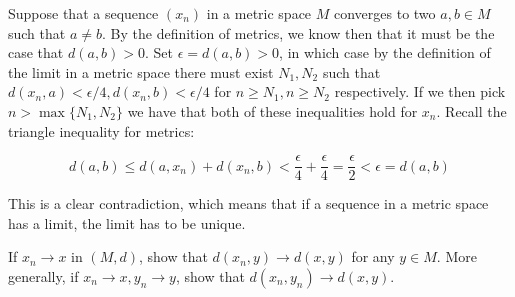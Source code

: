 \begin{solution}
    
    Suppose that a sequence $(x_n)$ in a metric space $M$ converges to two $a, b \in M$ such that $a \neq b$.
    By the definition of metrics, we know then that it must be the case that $d(a, b) > 0$.
    Set $\epsilon = d(a, b) > 0$, in which case by the definition of the limit in a metric space there must exist $N_1, N_2$ such that $d(x_n, a) < \epsilon/4, d(x_n, b) < \epsilon/4$ for $n \geq N_1, n \geq N_2$ respectively.
    If we then pick $n > \max\{N_1, N_2\}$ we have that both of these inequalities hold for $x_n$.
    Recall the triangle inequality for metrics:

    $$d(a, b) \leq d(a, x_n) + d(x_n, b) < \frac{\epsilon}{4} + \frac{\epsilon}{4} = \frac{\epsilon}{2} < \epsilon = d(a, b)$$

    This is a clear contradiction, which means that if a sequence in a metric space has a limit, the limit has to be unique.
\end{solution}

\begin{exercise}{34}
    If $x_n \rightarrow x$ in $(M, d)$, show that $d(x_n, y) \rightarrow d(x, y)$ for any $y \in M$.
    More generally, if $x_n \rightarrow x, y_n \rightarrow y$, show that $d(x_n, y_n) \rightarrow d(x, y)$.
\end{exercise}

